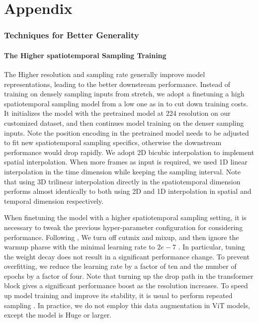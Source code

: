 \section{Appendix}


\subsubsection{Techniques for Better Generality}
\paragraph{The Higher spatiotemporal Sampling Training}
The Higher resolution and sampling rate generally improve model representations, leading to the better downstream performance. Instead of training on densely sampling inputs from stretch, we adopt a finetuning a high spatiotemporal sampling model from a low one as in \cite{wei2022masked} to cut down training costs. It initializes the model with the pretrained model at 224 resolution on our customized dataset, and then continues model training on the denser sampling inputs. Note the position encoding in the pretrained model needs to be adjusted to fit new spatiotemporal sampling specifics, otherwise the downstream performance would drop rapidly.
We adopt 2D bicubic interpolation to implement spatial interpolation. When more frames as input is required, we used 1D linear interpolation in the time dimension while keeping the sampling interval. Note that using 3D trilinear interpolation directly in the spatiotemporal dimension performs almost identically to both using 2D and 1D interpolation in spatial and temporal dimension respectively.

When finetuning the model with a higher spatiotemporal sampling setting, it is necessary to tweak the previous hyper-parameter configuration for considering performance. 
Following \cite{liu2022convnet}, We turn off cutmix and mixup, and then ignore the warmup pharse with the minimal learning rate to $2e-7$ \cite{liu2021swin}. In particular, tuning the weight decay does not result in a significant performance change. To prevent overfitting, we reduce the learning rate by a factor of ten and the number of epochs by a factor of four. Note that turning up the drop path in the transformer block gives a significant performance boost as the resolution increases. To speed up model training and improve its stability, it is usual to perform repeated sampling \cite{Hoffer2020AugmentYB}. In practice, we do not employ this data augmentation in ViT models, except the model is Huge or larger.

